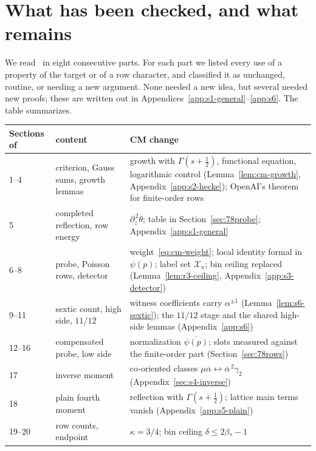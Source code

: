 \documentclass[11pt]{article}
\numberwithin{equation}{section}
\begin{document}
\section{What has been checked, and what remains}\label{sec:78status}
We read~\cite{OAI78} in eight consecutive parts. For each part we listed every use of a property of
the target or of a row character, and classified it as unchanged, routine, or needing a new argument.
None needed a new idea, but several needed new proofs; these are written out in
Appendices~\ref{app:s1-general}--\ref{app:s6}. The table summarizes.
\begin{center}
\small
\begin{tabular}{p{2.7cm}p{4.6cm}p{7.2cm}}
\toprule
Sections of~\cite{OAI78} & content & CM change\\\midrule
1--4 & criterion, Gauss sums, growth lemmas & growth with $\Gamma(s+\frac12)$, functional equation, logarithmic
 control (Lemma~\ref{lem:cm-growth}, Appendix~\ref{app:s2-hecke}); OpenAI's theorem for finite-order rows\\
5 & completed reflection, row energy & $\partial_{\bar z}^{\,2}\theta$; table in Section~\ref{sec:78probe};
 Appendix~\ref{app:s1-general}\\
6--8 & probe, Poisson rows, detector & weight~\eqref{eq:cm-weight}; local identity formal in $\psi(p)$;
 label set $\mathcal X_u$; bin ceiling \cite[Section~8.1]{OAI78} replaced (Lemma~\ref{lem:r3-ceiling},
 Appendix~\ref{app:s3-detector})\\
9--11 & sextic count, high side, $11/12$ & witness coefficients carry $\alpha^{\pm1}$
 (Lemma~\ref{lem:s6-sextic}); the $11/12$ stage and the shared high-side lemmas (Appendix~\ref{app:s6})\\
12--16 & compensated probe, low side & normalization $\overline{\psi(p)}$; slots measured against the
 finite-order part (Section~\ref{sec:78rows})\\
17 & inverse moment & co-oriented classes $\mu\overline\alpha\leftrightarrow\overline\alpha^{\,2}\gamma_2$
 (Appendix~\ref{sec:s4-inverse})\\
18 & plain fourth moment & reflection with $\Gamma(s+\frac12)$; lattice main terms vanish
 (Appendix~\ref{app:s5-plain})\\
19--20 & row counts, endpoint & $\kappa=3/4$; bin ceiling $\delta\le2\beta_*-1$\\\bottomrule
\end{tabular}
\end{center}
\end{document}

